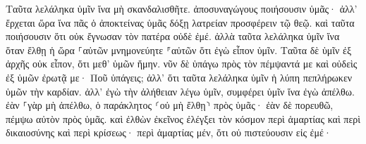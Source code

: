 \documentclass{openreader}
\begin{document}
Ταῦτα λελάληκα ὑμῖν ἵνα μὴ σκανδαλισθῆτε. 
ἀποσυναγώγους ποιήσουσιν ὑμᾶς· ἀλλ’ ἔρχεται ὥρα ἵνα πᾶς ὁ ἀποκτείνας ὑμᾶς δόξῃ λατρείαν προσφέρειν τῷ θεῷ. 
καὶ ταῦτα ποιήσουσιν ὅτι οὐκ ἔγνωσαν τὸν πατέρα οὐδὲ ἐμέ. 
ἀλλὰ ταῦτα λελάληκα ὑμῖν ἵνα ὅταν ἔλθῃ ἡ ὥρα ⸀αὐτῶν μνημονεύητε ⸁αὐτῶν ὅτι ἐγὼ εἶπον ὑμῖν. Ταῦτα δὲ ὑμῖν ἐξ ἀρχῆς οὐκ εἶπον, ὅτι μεθ’ ὑμῶν ἤμην. 
νῦν δὲ ὑπάγω πρὸς τὸν πέμψαντά με καὶ οὐδεὶς ἐξ ὑμῶν ἐρωτᾷ με· Ποῦ ὑπάγεις; 
ἀλλ’ ὅτι ταῦτα λελάληκα ὑμῖν ἡ λύπη πεπλήρωκεν ὑμῶν τὴν καρδίαν. 
ἀλλ’ ἐγὼ τὴν ἀλήθειαν λέγω ὑμῖν, συμφέρει ὑμῖν ἵνα ἐγὼ ἀπέλθω. ἐὰν ⸀γὰρ μὴ ἀπέλθω, ὁ παράκλητος ⸂οὐ μὴ ἔλθῃ⸃ πρὸς ὑμᾶς· ἐὰν δὲ πορευθῶ, πέμψω αὐτὸν πρὸς ὑμᾶς. 
καὶ ἐλθὼν ἐκεῖνος ἐλέγξει τὸν κόσμον περὶ ἁμαρτίας καὶ περὶ δικαιοσύνης καὶ περὶ κρίσεως· 
περὶ ἁμαρτίας μέν, ὅτι οὐ πιστεύουσιν εἰς ἐμέ· 
\end{document}

